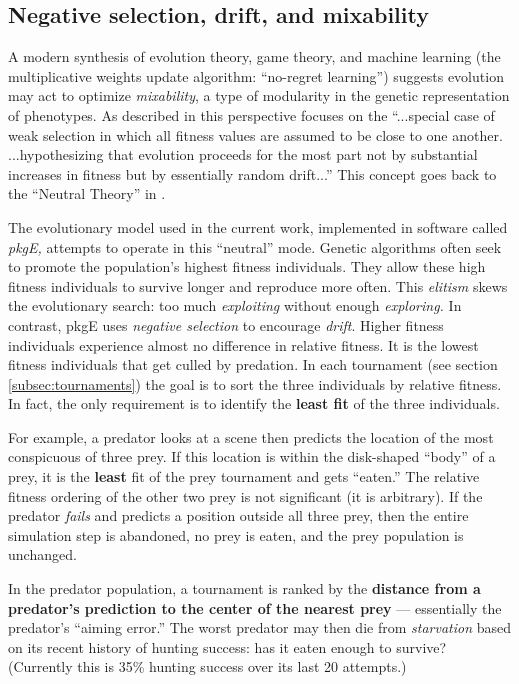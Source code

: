 \documentclass[acmtog]{acmart}
\newcommand{\jargon}[1]{\textit{#1}}
\newcommand{\lazypredator}[0]{pkgE}
\begin{document}
\subsection{Negative selection, drift, and mixability}

A modern synthesis \cite{livnat_sex_2016} of evolution theory, game theory, and machine learning (the multiplicative weights update algorithm: “no-regret learning”) suggests evolution may act to optimize \jargon{mixability}, a type of modularity in the genetic representation of phenotypes. As described in \citet{chastain_multiplicative_2013} this perspective focuses on the “...special case of weak selection in which all fitness values are assumed to be close to one another. ...hypothesizing that evolution proceeds for the most part not by substantial increases in fitness but by essentially random drift...” This concept goes back to the “Neutral Theory” in \citet{kimura_evolutionary_1968}.
\par
The evolutionary model used in the current work, implemented in software called \jargon{\lazypredator{},} attempts to operate in this “neutral” mode. Genetic algorithms often seek to promote the population's highest fitness individuals. They allow these high fitness individuals to survive longer and reproduce more often. This \jargon{elitism} skews the evolutionary search: too much \jargon{exploiting} without enough \jargon{exploring.}  In contrast, \lazypredator{} uses \textit{negative selection} to encourage \jargon{drift}. Higher fitness individuals experience almost no difference in  relative fitness. It is the lowest fitness individuals that get culled by predation. In each tournament (see section \ref{subsec:tournaments}) the goal is to sort the three individuals by relative fitness. In fact, the only requirement is to identify the \textbf{least fit} of the three individuals.
\par 
For example, a predator looks at a scene then predicts the location of the most conspicuous of three prey. If this location is within the disk-shaped “body” of a prey, it is the \textbf{least} fit of the prey tournament and gets “eaten.” The relative fitness ordering of the other two prey is not significant (it is arbitrary). If the predator \jargon{fails} and predicts a position outside all three prey, then the entire simulation step is abandoned, no prey is eaten, and the prey population is unchanged.
\par
In the predator population, a tournament is ranked by the \textbf{distance from a predator's prediction to the center of the nearest prey} — essentially the predator's “aiming error.” The worst predator may then die from \jargon{starvation} based on its recent history of hunting success: has it eaten enough to survive? (Currently this is 35\% hunting success over its last 20 attempts.)
\end{document}
